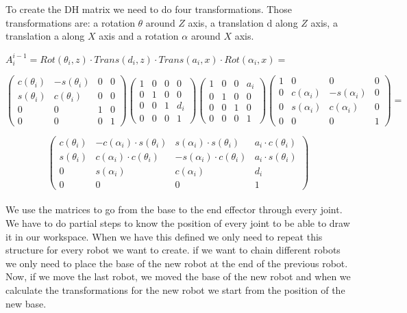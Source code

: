 \documentclass[12pt,a4paper,oneside,english]{book}
\begin{document}
To create the DH matrix we need to do four transformations. Those transformations are: a rotation $\theta$ around $Z$ axis, a translation d along $Z$ axis, a translation a along $X$ axis and a rotation $\alpha$ around $X$ axis.

$A_{i}^{i-1} = Rot(\theta_{i},z)\cdot Trans(d_{i},z)\cdot Trans(a_{i},x)\cdot Rot(\alpha_{i},x) =$

\[
  \begin{pmatrix}
    c(\theta_{i}) & -s(\theta_{i}) & 0 & 0 \\
    s(\theta_{i}) & c(\theta_{i})  & 0 & 0 \\
    0             & 0              & 1 & 0 \\
    0             & 0              & 0 & 1
  \end{pmatrix}
  \begin{pmatrix}
    1 & 0 & 0 & 0     \\
    0 & 1 & 0 & 0     \\
    0 & 0 & 1 & d_{i} \\
    0 & 0 & 0 & 1
  \end{pmatrix}
  \begin{pmatrix}
    1 & 0 & 0 & a_{i} \\
    0 & 1 & 0 & 0     \\
    0 & 0 & 1 & 0     \\
    0 & 0 & 0 & 1
  \end{pmatrix}
  \begin{pmatrix}
    1 & 0             & 0              & 0 \\
    0 & c(\alpha_{i}) & -s(\alpha_{i}) & 0 \\
    0 & s(\alpha_{i}) & c(\alpha_{i})  & 0 \\
    0 & 0             & 0              & 1
  \end{pmatrix}
  =
\]

\[
  \begin{pmatrix}
    c(\theta_{i}) & -c(\alpha_{i})\cdot s(\theta_{i}) & s(\alpha_{i})\cdot s(\theta_{i})  & a_{i}\cdot c(\theta_{i}) \\
    s(\theta_{i}) & c(\alpha_{i})\cdot c(\theta_{i})  & -s(\alpha_{i})\cdot c(\theta_{i}) & a_{i}\cdot s(\theta_{i}) \\
    0             & s(\alpha_{i})                     & c(\alpha_{i})                     & d_{i}                    \\
    0             & 0                                 & 0                                 & 1
  \end{pmatrix}
\]
\\
We use the matrices to go from the base to the end effector through every joint. We have to do partial steps to know the position of every joint to be able to draw it in our workspace. When we have this defined we only need to repeat this structure for every robot we want to create. if we want to chain different robots we only need to place the base of the new robot at the end of the previous robot. Now, if we move the last robot, we moved the base of the new robot and when we calculate the transformations for the new robot we start from the position of the new base.
\end{document}
